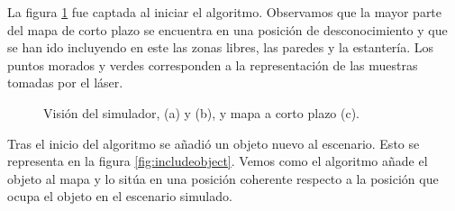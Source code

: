 La figura \ref{fig:initserver} fue captada al iniciar el algoritmo. Observamos que la mayor parte del mapa de corto plazo se encuentra en una posición de desconocimiento y que se han ido incluyendo en este las zonas libres, las paredes y la estantería. Los puntos morados y verdes corresponden a la representación de las muestras tomadas por el láser.

\begin{figure}[H]
  \begin{center}
  \end{center}
  \caption{Visión del simulador, (a) y (b), y mapa a corto plazo (c).}
  \label{fig:initserver}
\end{figure}

Tras el inicio del algoritmo se añadió un objeto nuevo al escenario. Esto se representa en la figura \ref{fig:includeobject}. Vemos como el algoritmo añade el objeto al mapa y lo sitúa en una posición coherente respecto a la posición que ocupa el objeto en el escenario simulado.

